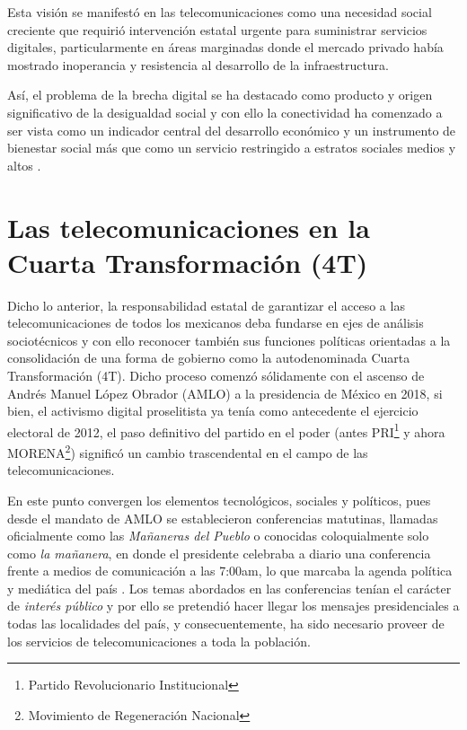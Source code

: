 \documentclass[
  spanish,
  11pt,
  a4paper,
]{scrbook}
\begin{document}
Esta visión se manifestó en las telecomunicaciones como una necesidad
social creciente que requirió intervención estatal urgente para
suministrar servicios digitales, particularmente en áreas marginadas
donde el mercado privado había mostrado inoperancia y resistencia al
desarrollo de la infraestructura.

Así, el problema de la brecha digital se ha destacado como producto y
origen significativo de la desigualdad social y con ello la conectividad
ha comenzado a ser vista como un indicador central del desarrollo
económico y un instrumento de bienestar social más que como un servicio
restringido a estratos sociales medios y altos \autocite{Sassen2002a}.

\section*{Las telecomunicaciones en la Cuarta Transformación
(4T)}\label{las-telecomunicaciones-en-la-cuarta-transformaciuxf3n-4t}


Dicho lo anterior, la responsabilidad estatal de garantizar el acceso a
las telecomunicaciones de todos los mexicanos deba fundarse en ejes de
análisis sociotécnicos y con ello reconocer también sus funciones
políticas orientadas a la consolidación de una forma de gobierno como la
autodenominada Cuarta Transformación (4T). Dicho proceso comenzó
sólidamente con el ascenso de Andrés Manuel López Obrador (AMLO) a la
presidencia de México en 2018, si bien, el activismo digital
proselitista ya tenía como antecedente el ejercicio electoral de 2012,
el paso definitivo del partido en el poder (antes PRI\footnote{Partido
  Revolucionario Institucional} y ahora MORENA\footnote{Movimiento de
  Regeneración Nacional}) significó un cambio trascendental en el campo
de las telecomunicaciones.

En este punto convergen los elementos tecnológicos, sociales y
políticos, pues desde el mandato de AMLO se establecieron conferencias
matutinas, llamadas oficialmente como las \emph{Mañaneras del Pueblo} o
conocidas coloquialmente solo como \emph{la mañanera}, en donde el
presidente celebraba a diario una conferencia frente a medios de
comunicación a las 7:00am, lo que marcaba la agenda política y mediática
del país \autocite{Andrade2021,Corral2024}. Los temas abordados en las
conferencias tenían el carácter de \emph{interés público} y por ello se
pretendió hacer llegar los mensajes presidenciales a todas las
localidades del país, y consecuentemente, ha sido necesario proveer de
los servicios de telecomunicaciones a toda la población.
\end{document}
